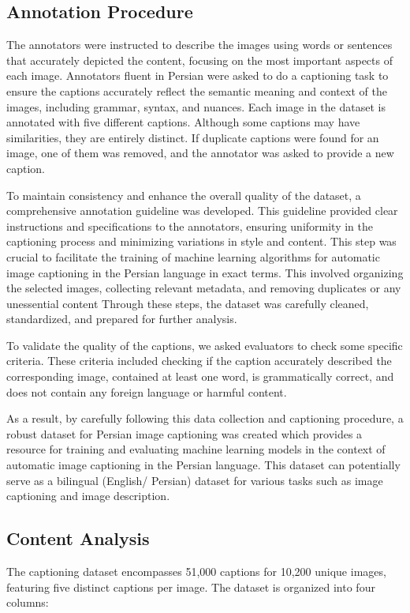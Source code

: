 \documentclass[lettersize,journal]{IEEEtran}
\begin{document}
\subsection{Annotation Procedure}
The annotators were instructed to describe the images using words or sentences that accurately depicted the content, focusing on the most important aspects of each image. Annotators fluent in Persian were asked to do a captioning task to ensure the captions accurately reflect the semantic meaning and context of the images, including grammar, syntax, and nuances. Each image in the dataset is annotated with five different captions. Although some captions may have similarities, they are entirely distinct. If duplicate captions were found for an image, one of them was removed, and the annotator was asked to provide a new caption.

To maintain consistency and enhance the overall quality of the dataset, a comprehensive annotation guideline was developed. This guideline provided clear instructions and specifications to the annotators, ensuring uniformity in the captioning process and minimizing variations in style and content. This step was crucial to facilitate the training of machine learning algorithms for automatic image captioning in the Persian language in exact terms. This involved organizing the selected images, collecting relevant metadata, and removing duplicates or any unessential content Through these steps, the dataset was carefully cleaned, standardized, and prepared for further analysis. 

To validate the quality of the captions, we asked evaluators to check some specific criteria. These criteria included checking if the caption accurately described the corresponding image, contained at least one word, is grammatically correct, and does not contain any foreign language or harmful content. 

As a result, by carefully following this data collection and captioning procedure, a robust dataset for Persian image captioning was created which provides a resource for training and evaluating machine learning models in the context of automatic image captioning in the Persian language. This dataset can potentially serve as a bilingual (English/ Persian) dataset for various tasks such as image captioning and image description.

\subsection{Content Analysis}
The captioning dataset encompasses 51,000 captions for 10,200 unique images, featuring five distinct captions per image. The dataset is organized into four columns:
\end{document}

